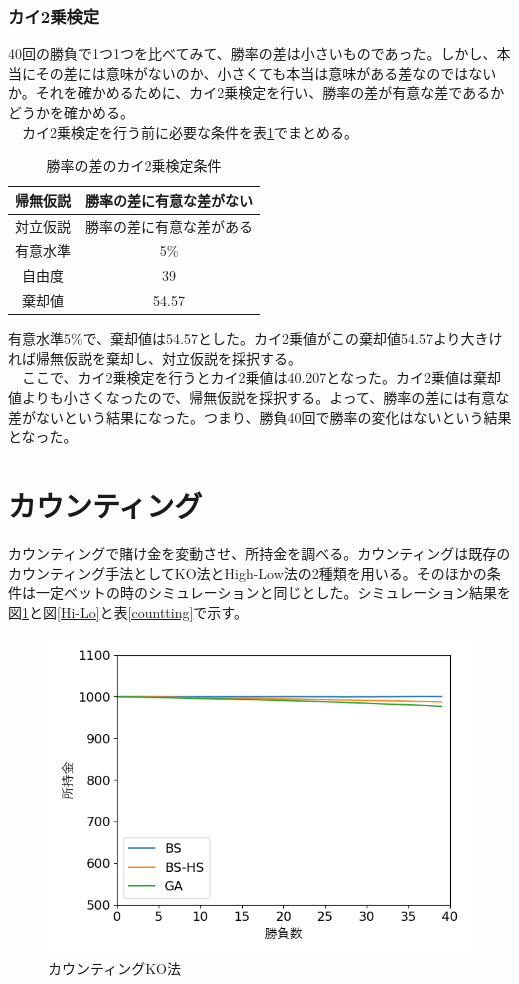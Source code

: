 \subsubsection{カイ2乗検定}
40回の勝負で1つ1つを比べてみて、勝率の差は小さいものであった。しかし、本当にその差には意味がないのか、小さくても本当は意味がある差なのではないか。それを確かめるために、カイ2乗検定を行い、勝率の差が有意な差であるかどうかを確かめる。\\
　カイ2乗検定を行う前に必要な条件を表\ref{win-x}でまとめる。
\begin{table}[H]
 \caption{勝率の差のカイ2乗検定条件\label{win-x}}
 \begin{center}
  \begin{tabular}{|c|c|}
  \hline 帰無仮説 & 勝率の差に有意な差がない \\
  \hline 対立仮説 & 勝率の差に有意な差がある \\
  \hline 有意水準 & 5\% \\
  \hline 自由度 & 39 \\
  \hline 棄却値 & 54.57\\
  \hline
  \end{tabular}
 \end{center}
\end{table}
有意水準5\%で、棄却値は54.57とした。カイ2乗値がこの棄却値54.57より大きければ帰無仮説を棄却し、対立仮説を採択する。\\
　ここで、カイ2乗検定を行うとカイ2乗値は40.207となった。カイ2乗値は棄却値よりも小さくなったので、帰無仮説を採択する。よって、勝率の差には有意な差がないという結果になった。つまり、勝負40回で勝率の変化はないという結果となった。

\section{カウンティング}
カウンティングで賭け金を変動させ、所持金を調べる。カウンティングは既存のカウンティング手法としてKO法とHigh-Low法の2種類を用いる。そのほかの条件は一定ベットの時のシミュレーションと同じとした。シミュレーション結果を図\ref{KO}と図\ref{Hi-Lo}と表\ref{countting}で示す。
\begin{figure}[H]
 \begin{center} 
  \includegraphics[width=0.7\linewidth]{./figure/betsimulation-KO}
  \caption{カウンティングKO法\label{KO}}
 \end{center}
\end{figure}

